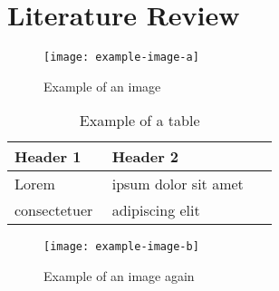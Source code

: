 \setcounter{figure}{0}
\setcounter{table}{0}
\section{Literature Review}
\lipsum[1-5]

\begin{figure}[t]
    \centering
    \caption{Example of an image}
    \texttt{[image: example-image-a]}
    \label{fig:lit review}
\end{figure}

\lipsum[1-10]
\begin{table}[t]
    \centering
    \caption{Example of a table}
    \begin{tabular}{p{0.35\linewidth} p{0.6\linewidth}}
    \hline
    Header 1 & Header 2 \\
    \hline
   Lorem & ipsum dolor sit amet\\
   consectetuer & adipiscing elit\\
    \end{tabular}
    \label{tab:my_label}
\end{table}
\lipsum[11-12]
\begin{figure}[t]
    \centering
    \caption{Example of an image again}
    \texttt{[image: example-image-b]}
    \label{fig:lit review 2}
\end{figure}